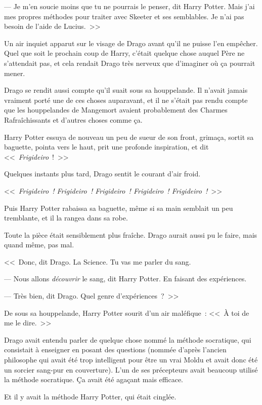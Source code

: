 --- Je m'en soucie moins que tu ne pourrais le penser, dit Harry Potter. Mais j'ai mes propres méthodes pour traiter avec Skeeter et ses semblables. Je n'ai pas besoin de l'aide de Lucius.~>>

Un air inquiet apparut sur le visage de Drago avant qu'il ne puisse l'en empêcher. Quel que soit le prochain coup de Harry, c'était quelque chose auquel Père ne s'attendait pas, et cela rendait Drago très nerveux que d'imaginer où ça pourrait mener.

Drago se rendit aussi compte qu'il suait sous sa houppelande. Il n'avait jamais vraiment porté une de ces choses auparavant, et il ne s'était pas rendu compte que les houppelandes de Mangemort avaient probablement des Charmes Rafraîchissants et d'autres choses comme ça.

Harry Potter essuya de nouveau un peu de sueur de son front, grimaça, sortit sa baguette, pointa vers le haut, prit une profonde inspiration, et dit <<~\emph{Frigideiro}~!~>>

Quelques instants plus tard, Drago sentit le courant d'air froid.

<<~\emph{Frigideiro~! Frigideiro~! Frigideiro~! Frigideiro~! Frigideiro~!}~>>

Puis Harry Potter rabaissa sa baguette, même si sa main semblait un peu tremblante, et il la rangea dans sa robe.

Toute la pièce était sensiblement plus fraîche. Drago aurait aussi pu le faire, mais quand même, pas mal.

<<~Donc, dit Drago. La Science. Tu vas me parler du sang.

--- Nous allons \emph{découvrir} le sang, dit Harry Potter. En faisant des expériences.

--- Très bien, dit Drago. Quel genre d'expériences~?~>>

De sous sa houppelande, Harry Potter sourit d'un air maléfique~: <<~À toi de me le dire.~>>

\later

Drago avait entendu parler de quelque chose nommé la méthode socratique, qui consistait à enseigner en posant des questions (nommée d'après l'ancien philosophe qui avait été trop intelligent pour être un vrai Moldu et avait donc été un sorcier sang-pur en couverture). L'un de ses précepteurs avait beaucoup utilisé la méthode socratique. Ça avait été agaçant mais efficace.

Et il y avait la méthode Harry Potter, qui était cinglée.

